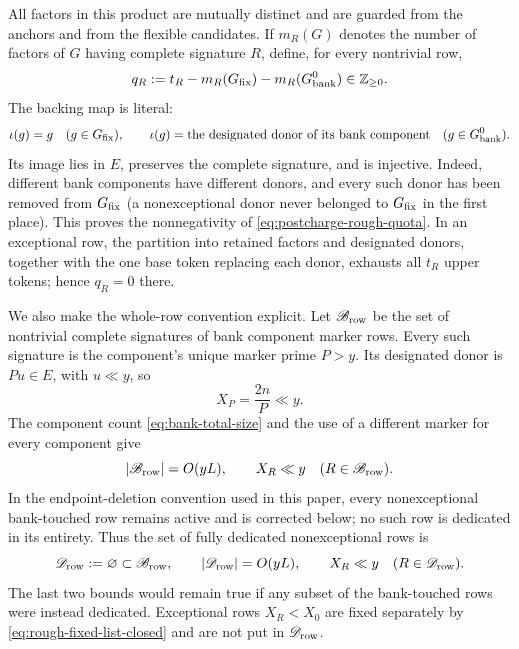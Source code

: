 \documentclass[11pt]{article}
\numberwithin{equation}{section}
\theoremstyle{definition}
\theoremstyle{remark}
\newcommand{\1}{\mathbf 1}
\begin{document}
All factors in this product are mutually distinct and are guarded from
the anchors and from the flexible candidates.  If \(m_R(G)\) denotes the
number of factors of \(G\) having complete signature \(R\), define, for
every nontrivial row,
\begin{equation}
 q_R:=t_R-m_R(G_{\rm fix})-m_R(G_{\rm bank}^0)\in\mathbb Z_{\ge0}.
 \label{eq:postcharge-rough-quota}
\end{equation}
The backing map is literal:
\begin{equation}
 \iota(g)=g\quad(g\in G_{\rm fix}),\qquad
 \iota(g)=\text{the designated donor of its bank component}
                   \quad(g\in G_{\rm bank}^0).
 \label{eq:rough-explicit-backing-injection}
\end{equation}
Its image lies in \(E\), preserves the complete signature, and is
injective.  Indeed, different bank components have different donors, and
every such donor has been removed from \(G_{\rm fix}\) (a nonexceptional
donor never belonged to \(G_{\rm fix}\) in the first place).  This proves
the nonnegativity of \eqref{eq:postcharge-rough-quota}.  In an exceptional
row, the partition into retained factors and designated donors, together
with the one base token replacing each donor, exhausts all \(t_R\) upper
tokens; hence \(q_R=0\) there.

We also make the whole-row convention explicit.  Let
\(\mathscr B_{\rm row}\) be the set of nontrivial complete signatures of
bank component marker rows.  Every such signature is the component's
unique marker prime \(P>y\).  Its designated donor is \(Pu\in E\), with
\(u\ll y\), so
\[
                   X_P=\frac{2n}{P}\ll y.
\]
The component count \eqref{eq:bank-total-size} and the use of a different
marker for every component give
\begin{equation}
 |\mathscr B_{\rm row}|=O(yL),\qquad
 X_R\ll y\quad(R\in\mathscr B_{\rm row}).
 \label{eq:rough-bank-touched-row-data}
\end{equation}
In the endpoint-deletion convention used in this paper, every
nonexceptional bank-touched row remains active and is corrected below; no
such row is dedicated in its entirety.  Thus the set of fully dedicated
nonexceptional rows is
\begin{equation}
 \mathscr D_{\rm row}:=\varnothing\subset\mathscr B_{\rm row},\qquad
 |\mathscr D_{\rm row}|=O(yL),\qquad
 X_R\ll y\quad(R\in\mathscr D_{\rm row}).
 \label{eq:rough-dedicated-row-data}
\end{equation}
The last two bounds would remain true if any subset of the bank-touched
rows were instead dedicated.  Exceptional rows \(X_R<X_0\) are fixed
separately by \eqref{eq:rough-fixed-list-closed} and are not put in
\(\mathscr D_{\rm row}\).
\end{document}
